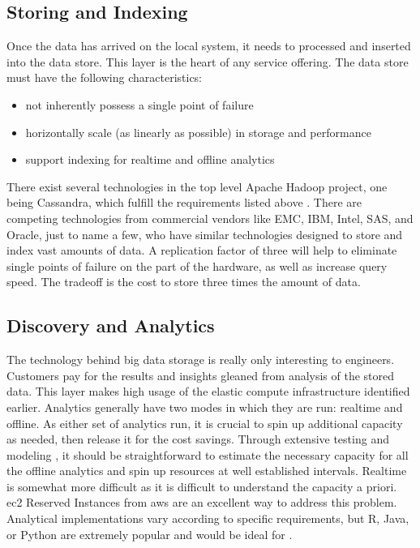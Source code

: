 \subsection{Storing and Indexing}
Once the data has arrived on the local system, it needs to processed and inserted into the data store. This layer is the heart of any service offering. The data store must have the following characteristics:
\begin{itemize}
	\item not inherently possess a single point of failure
	\item horizontally scale (as linearly as possible) in storage and performance
	\item support indexing for realtime and offline analytics
\end{itemize}
There exist several technologies in the top level Apache Hadoop project, one being Cassandra, which fulfill the requirements listed above \cite{cassandra}. There are competing technologies from commercial vendors like EMC, IBM, Intel, SAS, and Oracle, just to name a few, who have similar technologies designed to store and index vast amounts of data. A replication factor of three will help to eliminate single points of failure on the part of the hardware, as well as increase query speed. The tradeoff is the cost to store three times the amount of data.
\subsection{Discovery and Analytics}
The technology behind big data storage is really only interesting to engineers. Customers pay for the results and insights gleaned from analysis of the stored data. This layer makes high usage of the elastic compute infrastructure identified earlier. Analytics generally have two modes in which they are run: realtime and offline. As either set of analytics run, it is crucial to spin up additional capacity as needed, then release it for the cost savings. Through extensive testing and modeling , it should be straightforward to estimate the necessary capacity for all the offline analytics and spin up resources at well established intervals. Realtime is somewhat more difficult as it is difficult to understand the capacity a priori. \gls{ec2} Reserved Instances from \gls{aws} are an excellent way to address this problem. Analytical implementations vary according to specific requirements, but R, Java, or Python are extremely popular and would be ideal for \climatedge.
